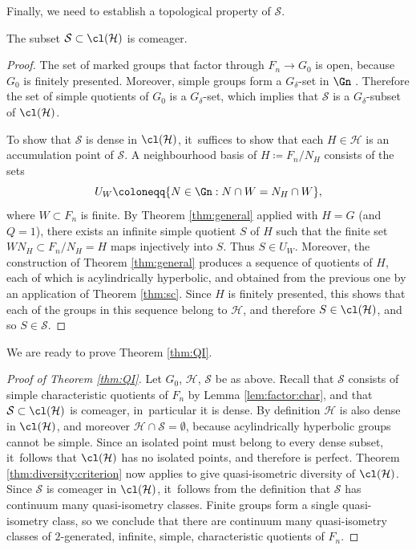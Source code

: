 Finally, we need to establish a topological property of $\mathcal{S}$.

\begin{lemma}
\label{lem:comeager}
The subset $\mathcal{S} \subset \cl(\mathcal{H})$ is comeager.
\end{lemma}

\begin{proof}
The set of marked groups that factor through $F_n \to G_0$ is open, because $G_0$ is finitely presented. Moreover, simple groups form a $G_\delta$-set in $\Gn$ \cite[Cor.\,4.5]{diversity}. Therefore the set of simple quotients of $G_0$ is a $G_\delta$-set, which implies that $\mathcal{S}$ is a $G_\delta$-subset of $\cl(\mathcal{H})$.

To show that $\mathcal{S}$ is dense in $\cl(\mathcal{H})$, it~suffices to show that each $H \in \mathcal{H}$ is an accumulation point of $\mathcal{S}$. A neighbourhood basis of $H \coloneqq F_n / N_H$ consists of the sets
\begin{equation*}
U_W \coloneqq \{ N \in \Gn : N \cap W = N_H \cap W \},
\end{equation*}
where $W \subset F_n$ is finite. By Theorem \ref{thm:general} applied with $H = G$ (and $Q = 1$), there exists an infinite simple quotient $S$ of $H$ such that the finite set $W N_H \subset F_n / N_H = H$ maps injectively into $S$. Thus $S \in U_W$. Moreover, the construction of Theorem \ref{thm:general} produces a sequence of quotients of $H$, each of which is acylindrically hyperbolic, and obtained from the previous one by an application of Theorem \ref{thm:sc}. Since $H$ is finitely presented, this shows that each of the groups in this sequence belong to $\mathcal{H}$, and therefore $S \in \cl(\mathcal{H})$, and so $S \in \mathcal{S}$.
\end{proof}

We are ready to prove Theorem \ref{thm:QI}.

\begin{proof}[Proof of Theorem \ref{thm:QI}]
Let $G_0$, $\mathcal{H}$, $\mathcal{S}$ be as above. Recall that $\mathcal{S}$ consists of simple characteristic quotients of $F_n$ by Lemma \ref{lem:factor:char}, and that $\mathcal{S} \subset \cl(\mathcal{H})$ is comeager, in~particular it is dense.
By definition $\mathcal{H}$ is also dense in $\cl(\mathcal{H})$, and moreover $\mathcal{H} \cap \mathcal{S} = \emptyset$, because acylindrically hyperbolic groups cannot be simple. Since an isolated point must belong to every dense subset, it~follows that $\cl(\mathcal{H})$ has no isolated points, and therefore is perfect.
Theorem \ref{thm:diversity:criterion} now applies to give quasi-isometric diversity of $\cl(\mathcal{H})$. Since $\mathcal{S}$ is comeager in $\cl(\mathcal{H})$, it~follows from the definition that $\mathcal{S}$ has continuum many quasi-isometry classes. Finite groups form a single quasi-isometry class, so we conclude that there are continuum many quasi-isometry classes of $2$-generated, infinite, simple, characteristic quotients of $F_n$.
\end{proof}

